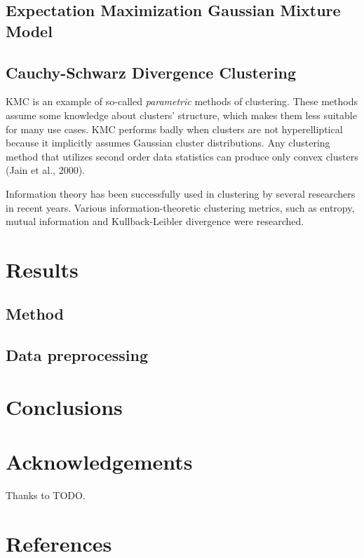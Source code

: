 \documentclass[]{IEEEphot}
\begin{document}
\subsection{Expectation Maximization Gaussian Mixture Model}

\subsection{Cauchy-Schwarz Divergence Clustering}
KMC is an example of so-called \textit{parametric} methods of clustering. These
methods assume some knowledge about clusters' structure, which makes them less
suitable for many use cases. KMC performs badly when clusters are not hyperelliptical
because it implicitly assumes Gaussian cluster distributions. Any clustering method
that utilizes second order data statistics can produce only convex clusters (Jain et al., 2000).

Information theory has been successfully used in clustering by several researchers in recent years.
Various information-theoretic clustering metrics, such as entropy, mutual information and
Kullback-Leibler divergence were researched.

\section{Results}
\subsection{Method}
\subsection{Data preprocessing}

\section{Conclusions}

\section*{Acknowledgements}
Thanks to TODO.

\section*{References}
\end{document}
